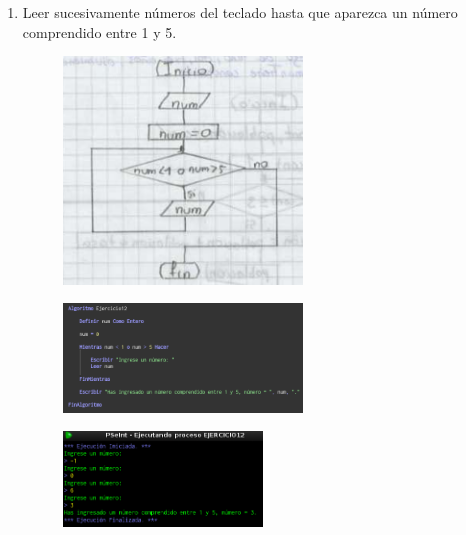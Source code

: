 \documentclass[12pt]{article}
\begin{document}
\begin{enumerate}
            \newpage 
            \item Leer sucesivamente números del teclado hasta que aparezca un número comprendido entre 1 y 5.
                
                \begin{figure}[!h]
                    \centering
                    \includegraphics[width=0.6\textwidth]{Img/DF_ej12.png}
                \end{figure}

                \begin{figure}[!h]
                    \centering
                    \includegraphics[width=0.6\textwidth]{Img/Cod_ej12.png}
                \end{figure}

                \begin{figure}[!h]
                    \centering
                    \includegraphics[width=0.5\textwidth]{Img/Ejec_ej12.png}
                \end{figure}


\end{enumerate}
\end{document}
